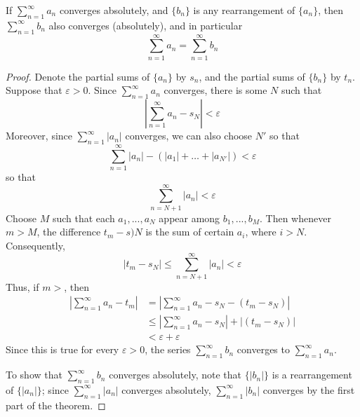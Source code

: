 \begin{thm}
    If $\sum\limits_{n=1}^{\infty}a_n$ converges absolutely, and $\{b_n\}$ is any rearrangement of $\{a_n\}$, then $\sum\limits_{n=1}^{\infty}b_n$ also converges (absolutely), and in particular \begin{equation*}
        \sum\limits_{n=1}^{\infty}a_n = \sum\limits_{n=1}^{\infty}b_n
    \end{equation*}
\end{thm}
\begin{proof}
    Denote the partial sums of $\{a_n\}$ by $s_n$, and the partial sums of $\{b_n\}$ by $t_n$. Suppose that $\varepsilon > 0$. Since $\sum\limits_{n=1}^{\infty}a_n$ converges, there is some $N$ such that \begin{equation*}
        \left|\sum\limits_{n=1}^{\infty}a_n - s_N\right| < \varepsilon
    \end{equation*}
    Moreover, since $\sum\limits_{n=1}^{\infty}|a_n|$ converges, we can also choose $N'$ so that \begin{equation*}
        \sum\limits_{n=1}^{\infty}|a_n| - (|a_1|+\hdots + |a_{N'}|) < \varepsilon
    \end{equation*}
    so that \begin{equation*}
        \sum\limits_{n=N+1}^{\infty}|a_n| < \varepsilon
    \end{equation*}
    Choose $M$ such that each $a_1,...,a_N$ appear among $b_1,...,b_M$. Then whenever $m > M$, the difference $t_m - s)N$ is the sum of certain $a_i$, where $i > N$. Consequently, \begin{equation*}
        |t_m-s_N| \leq \sum\limits_{n=N+1}^{\infty}|a_n| < \varepsilon
    \end{equation*}
    Thus, if $m > $, then \begin{align*}
        \left|\sum\limits_{n=1}^{\infty}a_n - t_m \right|&= \left|\sum\limits_{n=1}^{\infty}a_n - s_N - (t_m-s_N)\right| \\
        &\leq \left|\sum\limits_{n=1}^{\infty}a_n - s_N\right| +|(t_m-s_N)| \\
        &< \varepsilon + \varepsilon
    \end{align*}
    Since this is true for every $\varepsilon > 0$, the series $\sum\limits_{n=1}^{\infty}b_n$ converges to $\sum\limits_{n=1}^{\infty}a_n$.

    To show that $\sum\limits_{n=1}^{\infty}b_n$ converges absolutely, note that $\{|b_n|\}$ is a rearrangement of $\{|a_n|\}$; since $\sum\limits_{n=1}^{\infty}|a_n|$ converges absolutely, $\sum\limits_{n=1}^{\infty}|b_n|$ converges by the first part of the theorem.
\end{proof}


